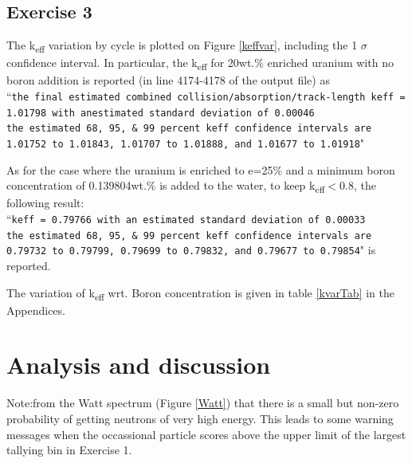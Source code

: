 \documentclass[a4paper, 11pt]{article}
\begin{document}
\subsection{Exercise 3} \label{Ex3Result}
The k\textsubscript{eff} variation by cycle is plotted on Figure \ref{keffvar}, including the 1 $\sigma$ confidence interval. In particular, the k\textsubscript{eff} for 20wt.\% enriched uranium with no boron addition is reported (in line 4174-4178 of the output file) as 
\\ ``\texttt{the final estimated combined collision/absorption/track-length keff = 1.01798 with anestimated standard deviation of 0.00046}
\\ \texttt{the estimated 68, 95, \& 99 percent keff confidence intervals are 1.01752 to 1.01843, 1.01707 to 1.01888, and 1.01677 to 1.01918}"

As for the case where the uranium is enriched to e=25\% and a minimum boron concentration of 0.139804wt.\% is added to the water, to keep k\textsubscript{eff}$<$0.8, the following result: \\``\texttt{keff = 0.79766 with an estimated standard deviation of 0.00033}\\\texttt{the estimated 68, 95, \& 99 percent keff confidence intervals are 0.79732 to 0.79799, 0.79699 to 0.79832, and 0.79677 to 0.79854}" is reported.

The variation of k\textsubscript{eff} wrt. Boron concentration is given in table \ref{kvarTab} in the Appendices.

\section{Analysis and discussion}
Note:from the Watt spectrum (Figure \ref{Watt}) that there is a small but non-zero probability of getting neutrons of very high energy. This leads to some warning messages when the occassional particle scores above the upper limit of the largest tallying bin in Exercise 1.
\end{document}
